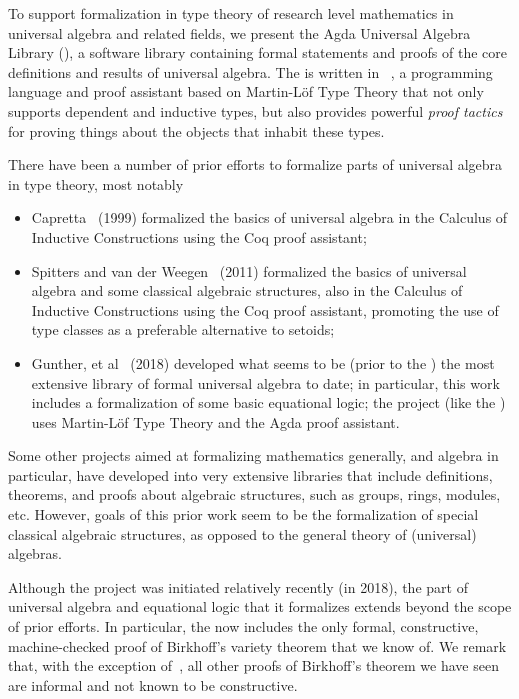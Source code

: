 To support formalization in type theory of research level mathematics in universal algebra and related fields, we present the Agda Universal Algebra Library (\agdaualib), a software library containing formal statements and proofs of the core definitions and results of universal algebra. 
The \ualib is written in \agda~\cite{Norell:2009}, a programming language and proof assistant based on Martin-L\"of Type Theory that not only supports dependent and inductive types, but also provides powerful \emph{proof tactics} for proving things about the objects that inhabit these types.

There have been a number of prior efforts to formalize parts of universal algebra in type theory, most notably
\begin{itemize}
  \item Capretta~\cite{Capretta:1999} (1999) formalized the basics of universal algebra in the Calculus of Inductive Constructions using the Coq proof assistant;
    \item Spitters and van der Weegen~\cite{Spitters:2011} (2011) formalized the basics of universal algebra and some classical algebraic structures, also in the Calculus of Inductive Constructions using the Coq proof assistant, promoting the use of type classes as a preferable alternative to setoids;
 \item Gunther, et al~\cite{Gunther:2018} (2018) developed what seems to be (prior to the \ualib) the most extensive library of formal universal algebra to date; in particular, this work includes a formalization of some basic equational logic; the project (like the \ualib) uses Martin-L\"of Type Theory and the Agda proof assistant.
\end{itemize}
Some other projects aimed at formalizing mathematics generally, and algebra in particular, have developed into very extensive libraries that include definitions, theorems, and proofs about algebraic structures, such as groups, rings, modules, etc.  However, goals of this prior work seem to be the formalization of special classical algebraic structures, as opposed to the general theory of (universal) algebras.

Although the \agdaualib project was initiated relatively recently (in 2018), the part of universal algebra and equational logic that it formalizes extends beyond the scope of prior efforts.  In particular, the \ualib now includes the only formal, constructive, machine-checked proof of Birkhoff's variety theorem that we know of. We remark that, with the exception of~\cite{Carlstrom:2008}, all other proofs of Birkhoff's theorem we have seen are informal and not known to be constructive.

